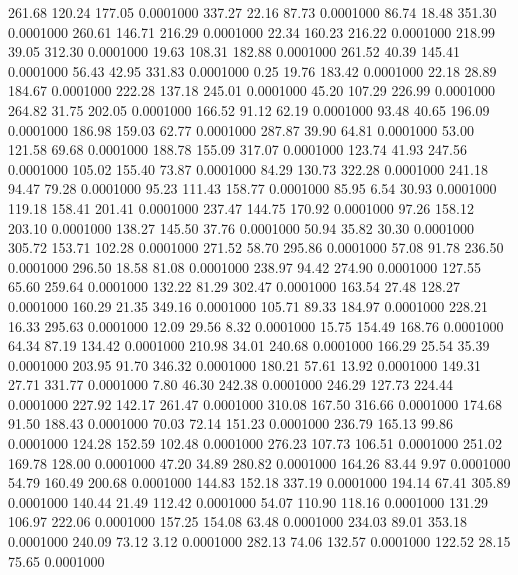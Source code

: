  261.68  120.24  177.05   0.0001000
 337.27   22.16   87.73   0.0001000
  86.74   18.48  351.30   0.0001000
 260.61  146.71  216.29   0.0001000
  22.34  160.23  216.22   0.0001000
 218.99   39.05  312.30   0.0001000
  19.63  108.31  182.88   0.0001000
 261.52   40.39  145.41   0.0001000
  56.43   42.95  331.83   0.0001000
   0.25   19.76  183.42   0.0001000
  22.18   28.89  184.67   0.0001000
 222.28  137.18  245.01   0.0001000
  45.20  107.29  226.99   0.0001000
 264.82   31.75  202.05   0.0001000
 166.52   91.12   62.19   0.0001000
  93.48   40.65  196.09   0.0001000
 186.98  159.03   62.77   0.0001000
 287.87   39.90   64.81   0.0001000
  53.00  121.58   69.68   0.0001000
 188.78  155.09  317.07   0.0001000
 123.74   41.93  247.56   0.0001000
 105.02  155.40   73.87   0.0001000
  84.29  130.73  322.28   0.0001000
 241.18   94.47   79.28   0.0001000
  95.23  111.43  158.77   0.0001000
  85.95    6.54   30.93   0.0001000
 119.18  158.41  201.41   0.0001000
 237.47  144.75  170.92   0.0001000
  97.26  158.12  203.10   0.0001000
 138.27  145.50   37.76   0.0001000
  50.94   35.82   30.30   0.0001000
 305.72  153.71  102.28   0.0001000
 271.52   58.70  295.86   0.0001000
  57.08   91.78  236.50   0.0001000
 296.50   18.58   81.08   0.0001000
 238.97   94.42  274.90   0.0001000
 127.55   65.60  259.64   0.0001000
 132.22   81.29  302.47   0.0001000
 163.54   27.48  128.27   0.0001000
 160.29   21.35  349.16   0.0001000
 105.71   89.33  184.97   0.0001000
 228.21   16.33  295.63   0.0001000
  12.09   29.56    8.32   0.0001000
  15.75  154.49  168.76   0.0001000
  64.34   87.19  134.42   0.0001000
 210.98   34.01  240.68   0.0001000
 166.29   25.54   35.39   0.0001000
 203.95   91.70  346.32   0.0001000
 180.21   57.61   13.92   0.0001000
 149.31   27.71  331.77   0.0001000
   7.80   46.30  242.38   0.0001000
 246.29  127.73  224.44   0.0001000
 227.92  142.17  261.47   0.0001000
 310.08  167.50  316.66   0.0001000
 174.68   91.50  188.43   0.0001000
  70.03   72.14  151.23   0.0001000
 236.79  165.13   99.86   0.0001000
 124.28  152.59  102.48   0.0001000
 276.23  107.73  106.51   0.0001000
 251.02  169.78  128.00   0.0001000
  47.20   34.89  280.82   0.0001000
 164.26   83.44    9.97   0.0001000
  54.79  160.49  200.68   0.0001000
 144.83  152.18  337.19   0.0001000
 194.14   67.41  305.89   0.0001000
 140.44   21.49  112.42   0.0001000
  54.07  110.90  118.16   0.0001000
 131.29  106.97  222.06   0.0001000
 157.25  154.08   63.48   0.0001000
 234.03   89.01  353.18   0.0001000
 240.09   73.12    3.12   0.0001000
 282.13   74.06  132.57   0.0001000
 122.52   28.15   75.65   0.0001000
